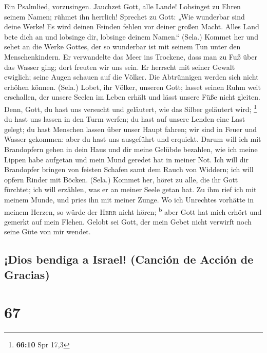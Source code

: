  Ein Psalmlied, vorzusingen. Jauchzet Gott, alle Lande!
 Lobsinget zu Ehren seinem Namen; rühmet ihn herrlich!
 Sprechet zu Gott: „Wie wunderbar sind deine Werke! Es
wird deinen Feinden fehlen vor deiner großen Macht.  Alles
Land bete dich an und lobsinge dir, lobsinge deinem Namen.`` (Sela.)
 Kommet her und sehet an die Werke Gottes, der so
wunderbar ist mit seinem Tun unter den Menschenkindern. 
Er verwandelte das Meer ins Trockene, dass man zu Fuß über das Wasser
ging; dort freuten wir uns sein.  Er herrscht mit seiner
Gewalt ewiglich; seine Augen schauen auf die Völker. Die Abtrünnigen
werden sich nicht erhöhen können. (Sela.)  Lobet, ihr
Völker, unseren Gott; lasset seinen Ruhm weit erschallen, 
der unsere Seelen im Leben erhält und lässt unsere Füße nicht gleiten.
 Denn, Gott, du hast uns versucht und geläutert, wie das
Silber geläutert wird; \footnote{\textbf{66:10} Spr 17,3}
 du hast uns lassen in den Turm werfen; du hast auf
unsere Lenden eine Last gelegt;  du hast Menschen lassen
über unser Haupt fahren; wir sind in Feuer und Wasser gekommen: aber du
hast uns ausgeführt und erquickt.  Darum will ich mit
Brandopfern gehen in dein Haus und dir meine Gelübde bezahlen,
 wie ich meine Lippen habe aufgetan und mein Mund geredet
hat in meiner Not.  Ich will dir Brandopfer bringen von
feisten Schafen samt dem Rauch von Widdern; ich will opfern Rinder mit
Böcken. (Sela.)  Kommet her, höret zu alle, die ihr Gott
fürchtet; ich will erzählen, was er an meiner Seele getan hat.
 Zu ihm rief ich mit meinem Munde, und pries ihn mit
meiner Zunge.  Wo ich Unrechtes vorhätte in meinem
Herzen, so würde der \textsc{Herr} nicht hören; \textsuperscript{b}
 aber Gott hat mich erhört und gemerkt auf mein Flehen.
 Gelobt sei Gott, der mein Gebet nicht verwirft noch
seine Güte von mir wendet.

\hypertarget{dios-bendiga-a-israel-canciuxf3n-de-acciuxf3n-de-gracias}{%
\subsection{¡Dios bendiga a Israel! (Canción de Acción de
Gracias)}\label{dios-bendiga-a-israel-canciuxf3n-de-acciuxf3n-de-gracias}}

\hypertarget{section-66}{%
\section{67}\label{section-66}}

